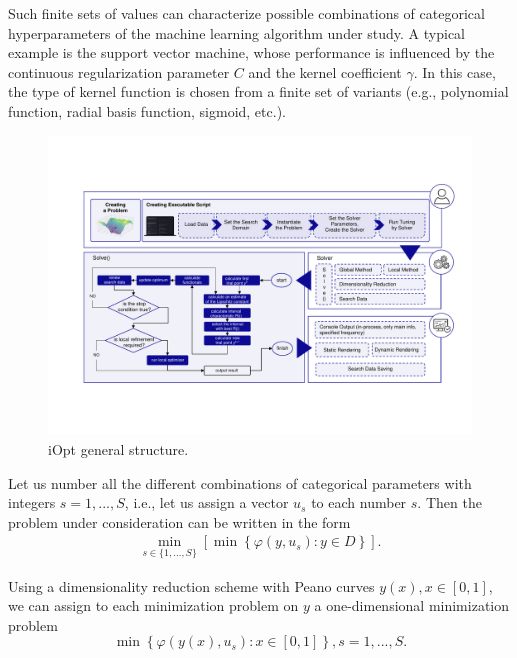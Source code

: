\documentclass[iicol]{sn-jnl}
\theoremstyle{thmstyleone}%
\theoremstyle{thmstyletwo}%
\theoremstyle{thmstylethree}%
\begin{document}
Such finite sets of values can characterize possible combinations of categorical hyperparameters of the machine learning algorithm under study. A typical example is the support vector machine, whose performance is influenced by the continuous regularization parameter $C$ and the kernel coefficient $\gamma$. In this case, the type of kernel function is chosen from a finite set of variants (e.g., polynomial function, radial basis function, sigmoid, etc.). 

\begin{figure}[t]
\centering
\includegraphics[width=1.0\textwidth]{scheme.pdf}
\caption{iOpt general structure.} \label{fig_iOpt}
\end{figure}

Let us number all the different combinations of categorical parameters with integers $s = 1,...,S$, i.e., let us assign a vector $u_s$ to each number $s$. Then the problem under consideration can be written in the form
\begin{gather}\label{problem_is}
 \min_{s\in\{1,...,S\}}\left[\min{\left\{ \varphi(y,u_s) : y\in D \right\}}\right].
\end{gather}

Using a dimensionality reduction scheme with Peano curves $y(x), x\in [0,1]$,  we can assign to each minimization problem on $y$ a one-dimensional minimization problem
\begin{equation}\label{fi_s}
 \min{\left\{ \varphi(y(x),u_s): x \in [0,1] \right\}}, s = 1,...,S.
\end{equation}
\end{document}
